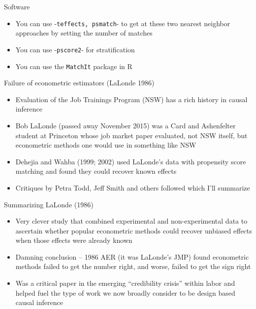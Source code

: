 \documentclass{beamer}
\begin{document}
\begin{frame}{Software}

\begin{itemize}
\item You can use -\texttt{teffects, psmatch}- to get at these two nearest neighbor approaches by setting the number of matches
\item You can use -\texttt{pscore2}- for stratification
\item You can use the \texttt{MatchIt} package in R
\end{itemize}

\end{frame}



\begin{frame}{Failure of econometric estimators (LaLonde 1986)}
	
	\begin{itemize}
	\item Evaluation of the Job Trainings Program (NSW) has a rich history in causal inference
	\item Bob LaLonde (passed away November 2015) was a Card and Ashenfelter student at Princeton whose job market paper evaluated, not NSW itself, but econometric methods one would use in something like NSW
	\item Dehejia and Wahba (1999; 2002) used LaLonde's data with propensity score matching and found they could recover known effects
	\item Critiques by Petra Todd, Jeff Smith and others followed which I'll summarize
	\end{itemize}
\end{frame}

\begin{frame}{Summarizing LaLonde (1986)}

		\begin{itemize}
		\item Very clever study that combined experimental and non-experimental data to ascertain whether popular econometric methods could recover unbiased effects when those effects were already known 
		\item Damning conclusion -- 1986 AER (it was LaLonde's JMP) found econometric methods failed to get the number right, and worse, failed to get the sign right
		\item Was a critical paper in the emerging ``credibility crisis'' within labor and helped fuel the type of work we now broadly consider to be design based causal inference
		\end{itemize}

\end{frame}
\end{document}

